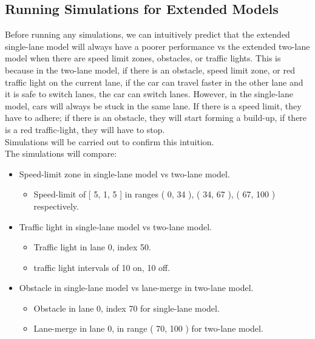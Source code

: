 \documentclass[11pt]{article}
\providecommand{\tightlist}{%
      \setlength{\itemsep}{0pt}\setlength{\parskip}{0pt}}
\begin{document}
        \subsection{Running Simulations for Extended Models}

Before running any simulations, we can intuitively predict that the
extended single-lane model will always have a poorer performance vs the
extended two-lane model when there are speed limit zones, obstacles, or
traffic lights. This is because in the two-lane model, if there is an
obstacle, speed limit zone, or red traffic light on the current lane, if
the car can travel faster in the other lane and it is safe to switch
lanes, the car can switch lanes. However, in the single-lane model, cars
will always be stuck in the same lane. If there is a speed limit, they
have to adhere; if there is an obstacle, they will start forming a
build-up, if there is a red traffic-light, they will have to stop.\\

Simulations will be carried out to confirm this intuition.\\

The simulations will compare:

\begin{itemize}
\item
  Speed-limit zone in single-lane model vs two-lane model.

  \begin{itemize}
  \tightlist
  \item
    Speed-limit of {[} 5, 1, 5 {]} in ranges ( 0, 34 ), ( 34, 67 ), (
    67, 100 ) respectively.
  \end{itemize}
\item
  Traffic light in single-lane model vs two-lane model.

  \begin{itemize}
  \item
    Traffic light in lane 0, index 50.
  \item
    traffic light intervals of 10 on, 10 off.
  \end{itemize}
\item
  Obstacle in single-lane model vs lane-merge in two-lane model.

  \begin{itemize}
  \item
    Obstacle in lane 0, index 70 for single-lane model.
  \item
    Lane-merge in lane 0, in range ( 70, 100 ) for two-lane model.
  \end{itemize}
\end{itemize}
\end{document}
